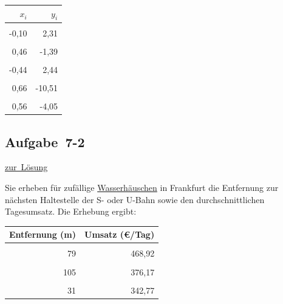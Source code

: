 \documentclass[
  11pt,
  ngerman,
  a4paper,
]{report}
\begin{document}
\begin{table}
\centering
\begin{tabular}{rr}
\toprule
\textbf{$x_i$} & \textbf{$y_i$}\\
\midrule
\cellcolor{gray!6}{-1,17} & \cellcolor{gray!6}{14,40}\\
-0,10 & 2,31\\
\cellcolor{gray!6}{-0,15} & \cellcolor{gray!6}{2,95}\\
0,46 & -1,39\\
\cellcolor{gray!6}{0,34} & \cellcolor{gray!6}{-2,96}\\
-0,44 & 2,44\\
\cellcolor{gray!6}{2,13} & \cellcolor{gray!6}{-20,47}\\
0,66 & -10,51\\
\cellcolor{gray!6}{-1,37} & \cellcolor{gray!6}{11,81}\\
0,56 & -4,05\\
\bottomrule
\end{tabular}
\end{table}

\hypertarget{aufgabe-7-2}{%
\subsection{Aufgabe~7-2}\label{aufgabe-7-2}}

\protect\hyperlink{loesung-7-2}{zur~Lösung}

Sie erheben für zufällige \href{https://frankfurt.de/frankfurt-entdecken-und-erleben/stadtportrait/typisch-frankfurt/wasserhaeuschen}{Wasserhäuschen} in Frankfurt die Entfernung zur nächsten Haltestelle der S- oder U-Bahn sowie den durchschnittlichen Tagesumsatz. Die Erhebung ergibt:

\begin{table}
\centering
\begin{tabular}{rr}
\toprule
\textbf{Entfernung (m)} & \textbf{Umsatz (€/Tag)}\\
\midrule
\cellcolor{gray!6}{35} & \cellcolor{gray!6}{394,61}\\
79 & 468,92\\
\cellcolor{gray!6}{234} & \cellcolor{gray!6}{385,75}\\
105 & 376,17\\
\cellcolor{gray!6}{318} & \cellcolor{gray!6}{283,26}\\
31 & 342,77\\
\bottomrule
\end{tabular}
\end{table}
\end{document}
